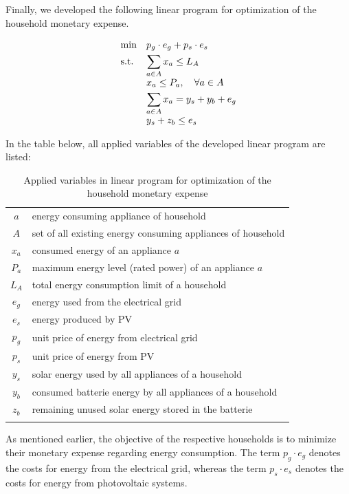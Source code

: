 Finally, we developed the following linear program for optimization of the household monetary expense.

\begin{equation}
    \begin{array}{ll@{}ll}
        \text{min}  & \displaystyle p_{g} \cdot e_{g} + p_{s} \cdot e_{s} &\\
        \text{s.t.}& \displaystyle \sum\limits_{a \in A}^{} x_{a} \leq L_{A}  \\
					& \displaystyle x_{a} \leq P_{a}, \quad \forall a \in A \\
					& \displaystyle \sum\limits_{a \in A}^{} x_{a} = y_{s} + y_{b} + e_{g} \\
					& \displaystyle y_{s} + z_{b} \leq e_{s}
    \end{array}
\end{equation}

\clearpage
In the table below, all applied variables of the developed linear program are listed:

\begin{longtable}{c|l}
	\hline
    $a$ & energy consuming appliance of household \\
	$A$ & set of all existing energy consuming appliances of household \\
	$x_{a}$ & consumed energy of an appliance $a$ \\
	$P_{a}$ & maximum energy level (rated power) of an appliance $a$ \\
	$L_{A}$ & total energy consumption limit of a household \\
	$e_{g}$ & energy used from the electrical grid \\
	$e_{s}$ & energy produced by PV \\
	$p_{g}$ & unit price of energy from electrical grid \\
	$p_{s}$ & unit price of energy from PV \\
	$y_{s}$ & solar energy used by all appliances of a household \\
	$y_{b}$ & consumed batterie energy by all appliances of a household \\
	$z_{b}$ & remaining unused solar energy stored in the batterie \\
	\hline
	\caption{Applied variables in linear program for optimization of the household monetary expense}
	\label{table:sorted_gas_prices}
\end{longtable} 

As mentioned earlier,
the objective of the respective households is to minimize
their monetary expense regarding energy consumption.
The term $p_{g} \cdot e_{g}$ denotes the costs for energy from the electrical
grid, whereas the term $p_{s} \cdot e_{s}$ denotes the costs for energy from photovoltaic systems. 

